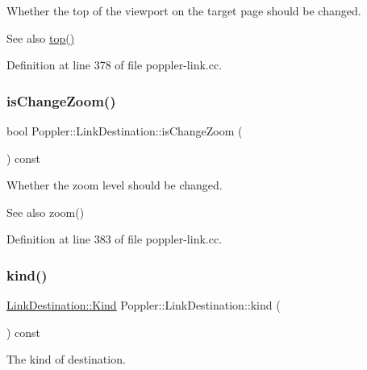 Whether the top of the viewport on the target page should be changed.

\begin{DoxySeeAlso}{See also}
\hyperlink{class_poppler_1_1_link_destination_ab890fec31bee5e967c56b443b068f62f}{top()} 
\end{DoxySeeAlso}


Definition at line 378 of file poppler-\/link.\+cc.

\mbox{\label{class_poppler_1_1_link_destination_ac370c7a2833099390ee4054c02a4b84f}} 
\subsubsection{\texorpdfstring{is\+Change\+Zoom()}{isChangeZoom()}}
{\footnotesize\ttfamily bool Poppler\+::\+Link\+Destination\+::is\+Change\+Zoom (\begin{DoxyParamCaption}{ }\end{DoxyParamCaption}) const}

Whether the zoom level should be changed.

\begin{DoxySeeAlso}{See also}
zoom() 
\end{DoxySeeAlso}


Definition at line 383 of file poppler-\/link.\+cc.

\mbox{\label{class_poppler_1_1_link_destination_a967d58c1f147720ae0091d0669e6684b}} 
\subsubsection{\texorpdfstring{kind()}{kind()}}
{\footnotesize\ttfamily \hyperlink{class_poppler_1_1_link_destination_a97a2b266fbd0c48fc0189269b9941810}{Link\+Destination\+::\+Kind} Poppler\+::\+Link\+Destination\+::kind (\begin{DoxyParamCaption}{ }\end{DoxyParamCaption}) const}

The kind of destination. 

